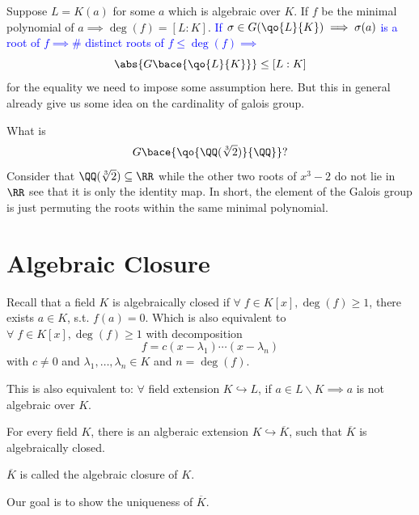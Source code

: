 \begin{remark}
	Suppose \( L = K(a) \) for some \( a \) which is algebraic over \( K \). If \( f \) be the minimal
	polynomial of \( a \implies \deg(f) = [L:K] \). \textcolor{blue}{If \( \sigma \in G(\qo{L}{K}) \implies \sigma(a) \) is a root
		of \( f \implies \# \) distinct roots of \( f \leq \deg(f) \implies \)}
	\[
		\abs{G\bace{\qo{L}{K}}} \leq [L:K]
	\]
	for the equality we need to impose some assumption here. But this in general already give us some
	idea on the cardinality of galois group.
\end{remark}

\begin{eg}
	What is
	\[
		G\bace{\qo{\QQ(\sqrt[3]{2})}{\QQ}}?
	\]
	Consider that \( \QQ(\sqrt[3]{2}) \subseteq \RR \) while the other two roots of \( x^3 - 2 \) do
	not lie in \( \RR \) see that it is only the identity map. In short, the element of the Galois
	group is just permuting the roots within the same minimal polynomial.
\end{eg}

\section{Algebraic Closure}
Recall that a field \( K \) is algebraically closed if \( \forall \; f\in K[x], \deg(f)\geq 1 \),
there exists \( a\in K \), s.t. \( f(a) = 0 \). Which is also equivalent to \( \forall \; f \in K[x], \deg(f) \geq 1 \)
with decomposition
\[
	f = c(x-\lambda_1)\cdots(x-\lambda_n)
\]
with \( c\ne 0 \) and \( \lambda_1,\ldots,\lambda_n \in K \) and \( n = \deg(f) \).

\begin{exercise}
	This is also equivalent to: \( \forall \) field extension \( K \hookrightarrow L \), if \( a \in
	L\smallsetminus K \implies a \) is not algebraic over \( K \).
\end{exercise}

\begin{theorem}
	For every field \( K \), there is an algberaic extension \( K \hookrightarrow \overline{K} \),
	such that \( \overline{K} \) is algebraically closed.
\end{theorem}

\begin{definition}
	\( \overline{K} \) is called the algebraic closure of \( K \).
\end{definition}
Our goal is to show the uniqueness of \( \overline{K} \).

